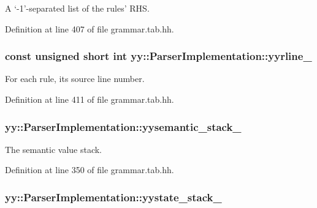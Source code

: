 A `-\/1'-\/separated list of the rules' RHS. 



Definition at line 407 of file grammar.tab.hh.

\hypertarget{classyy_1_1_parser_implementation_a4cede2ed2e3453c568199b63672fa746}{
\subsubsection[{yyrline\_\-}]{\setlength{\rightskip}{0pt plus 5cm}const unsigned short int {\bf yy::ParserImplementation::yyrline\_\-}}}
\label{classyy_1_1_parser_implementation_a4cede2ed2e3453c568199b63672fa746}


For each rule, its source line number. 



Definition at line 411 of file grammar.tab.hh.

\hypertarget{classyy_1_1_parser_implementation_a5b73cdc486e32cb025ab0e4423d65f99}{
\subsubsection[{yysemantic\_\-stack\_\-}]{ {\bf yy::ParserImplementation::yysemantic\_\-stack\_\-}}}
\label{classyy_1_1_parser_implementation_a5b73cdc486e32cb025ab0e4423d65f99}


The semantic value stack. 



Definition at line 350 of file grammar.tab.hh.

\hypertarget{classyy_1_1_parser_implementation_a6d0d1eecdcab5bd454bfe5484c026849}{
\subsubsection[{yystate\_\-stack\_\-}]{ {\bf yy::ParserImplementation::yystate\_\-stack\_\-}}}
\label{classyy_1_1_parser_implementation_a6d0d1eecdcab5bd454bfe5484c026849}


